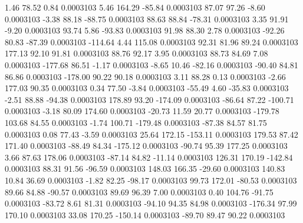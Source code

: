         1.46       78.52        0.84     0.0003103
        5.46      164.29      -85.84     0.0003103
       87.07       97.26       -8.60     0.0003103
       -3.38       88.18      -88.75     0.0003103
       88.63       88.84      -78.31     0.0003103
        3.35       91.91       -9.20     0.0003103
       93.74        5.86      -93.83     0.0003103
       91.98       88.30        2.78     0.0003103
      -92.26       80.83      -87.39     0.0003103
     -114.64        4.44      115.08     0.0003103
       92.31       81.96       89.24     0.0003103
      177.13       92.10       91.81     0.0003103
       88.76       92.17        3.95     0.0003103
       88.73       84.69        7.08     0.0003103
     -177.68       86.51       -1.17     0.0003103
       -8.65       10.46      -82.16     0.0003103
      -90.40       84.81       86.86     0.0003103
     -178.00       90.22       90.18     0.0003103
        3.11       88.28        0.13     0.0003103
       -2.66      177.03       90.35     0.0003103
        0.34       77.50       -3.84     0.0003103
      -55.49        4.60      -35.83     0.0003103
       -2.51       88.88      -94.38     0.0003103
      178.89       93.20     -174.09     0.0003103
      -86.64       87.22     -100.71     0.0003103
       -3.18       80.09      174.60     0.0003103
      -20.73       11.59       20.77     0.0003103
     -179.78      103.68       84.55     0.0003103
       -1.74      100.71     -179.48     0.0003103
      -87.38       84.57       81.75     0.0003103
        0.08       77.43       -3.59     0.0003103
       25.64      172.15     -153.11     0.0003103
      179.53       87.42      171.40     0.0003103
      -88.49       84.34     -175.12     0.0003103
      -90.74       95.39      177.25     0.0003103
        3.66       87.63      178.06     0.0003103
      -87.14       84.82      -11.14     0.0003103
      126.31      170.19     -142.84     0.0003103
       88.31       91.56      -96.59     0.0003103
      148.03      166.35      -29.60     0.0003103
      140.83       10.84       36.69     0.0003103
       -1.82       82.25      -98.17     0.0003103
       99.73      172.01      -80.53     0.0003103
       89.66       84.88      -90.57     0.0003103
       89.69       96.39        7.00     0.0003103
        0.40      104.76      -91.75     0.0003103
      -83.72        8.61       81.31     0.0003103
      -94.10       94.35       84.98     0.0003103
     -176.34       97.99      170.10     0.0003103
       33.08      170.25     -150.14     0.0003103
      -89.70       89.47       90.22     0.0003103
